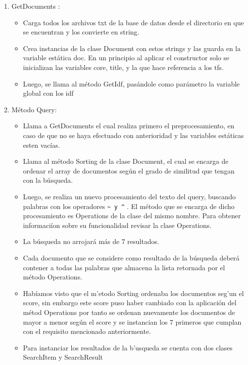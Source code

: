 \documentclass[12pt]{article}
\begin{document}
 \begin{enumerate}
 \item GetDocuments : 
 \begin{itemize}
 \item Carga todos los archivos txt de la base de datos desde el directorio en que se encuentran y los convierte en string.
\item Crea instancias de la clase Document con estos strings y las guarda en la variable est\'atica doc.
En un principio al aplicar el constructor solo se inicializan las variables core, title, y la que hace referencia a los tfs.
\item Luego, se llama al m\'etodo GetIdf, pas\'andole como par\'ametro la variable global con los idf
\end{itemize}

 \item M\'etodo Query:
 \begin{itemize}
 \item Llama a GetDocuments el cual realiza primero el preprocesamiento, en caso de que no se haya efectuado con anterioridad y las variables est\'aticas esten vac\'ias.

 \item Llama al m\'etodo Sorting de la clase Document, el cual se encarga de ordenar el array de documentos según el grado de similitud que tengan con la b\'usqueda.

 \item Luego, se realiza un nuevo procesamiento del texto del query, buscando palabras con los operadores \verb|~ y ^| .  El m\'etodo que se encarga de dicho procesamiento es Operations de la clase del mismo nombre. Para obtener informaci\'ion sobre su funcionalidad revisar la clase Operations. 

 \item La b\'usqueda no arrojar\'a m\'as de 7 resultados. 
 \item Cada documento que se considere como resultado de la b\'usqueda deber\'a contener a todas las palabras que almacena la lista retornada por el m\'etodo Operations.

 \item Hab\'iamos visto que el m'etodo Sorting ordenaba los documentos seg'un el score, sin embargo este score puso haber cambiado con la aplicaci\'on del m\'etod Operations por tanto se ordenan nuevamente los documentos de mayor a menor según el score y se instancian los 7 primeros que cumplan con el requisito mencionado anteriormente.

 \item Para instanciar los resultados de la b'usqueda se cuenta con dos clases SearchItem y SearchResult
\end{itemize}
\end{enumerate}
\end{document}
